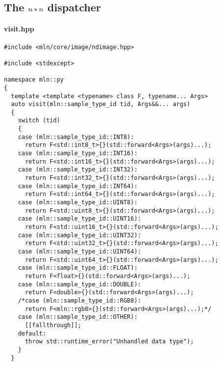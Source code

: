 \subsection{The $\protect n*n$ dispatcher}
\label{appendix:static-dynamic-bridge.mm.nndispatcher}

\paragraph{visit.hpp}

\begin{verbatim}
#include <mln/core/image/ndimage.hpp>

#include <stdexcept>

namespace mln::py
{
  template <template <typename> class F, typename... Args>
  auto visit(mln::sample_type_id tid, Args&&... args)
  {
    switch (tid)
    {
    case (mln::sample_type_id::INT8):
      return F<std::int8_t>{}(std::forward<Args>(args)...);
    case (mln::sample_type_id::INT16):
      return F<std::int16_t>{}(std::forward<Args>(args)...);
    case (mln::sample_type_id::INT32):
      return F<std::int32_t>{}(std::forward<Args>(args)...);
    case (mln::sample_type_id::INT64):
      return F<std::int64_t>{}(std::forward<Args>(args)...);
    case (mln::sample_type_id::UINT8):
      return F<std::uint8_t>{}(std::forward<Args>(args)...);
    case (mln::sample_type_id::UINT16):
      return F<std::uint16_t>{}(std::forward<Args>(args)...);
    case (mln::sample_type_id::UINT32):
      return F<std::uint32_t>{}(std::forward<Args>(args)...);
    case (mln::sample_type_id::UINT64):
      return F<std::uint64_t>{}(std::forward<Args>(args)...);
    case (mln::sample_type_id::FLOAT):
      return F<float>{}(std::forward<Args>(args)...);
    case (mln::sample_type_id::DOUBLE):
      return F<double>{}(std::forward<Args>(args)...);
    /*case (mln::sample_type_id::RGB8):
      return F<mln::rgb8>{}(std::forward<Args>(args)...);*/
    case (mln::sample_type_id::OTHER):
      [[fallthrough]];
    default:
      throw std::runtime_error("Unhandled data type");
    }
  }


\end{verbatim}

